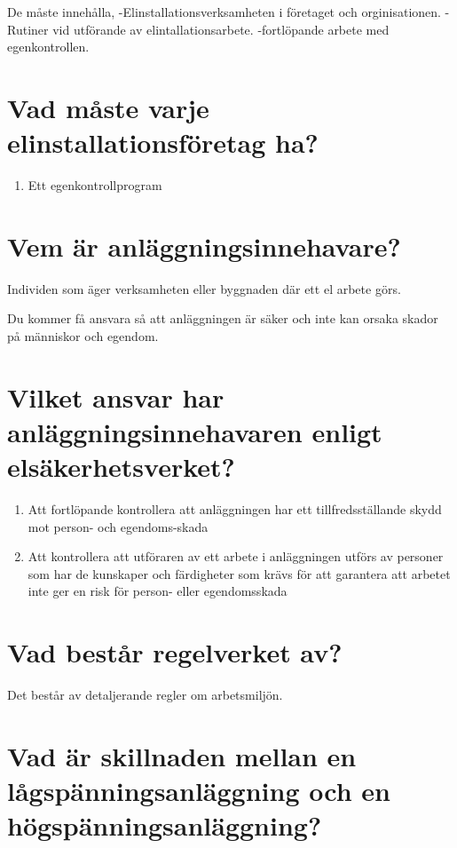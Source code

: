 \documentclass[a4paper,swedish]{article}
\begin{document}
De måste innehålla,
-Elinstallationsverksamheten i företaget och orginisationen.
- Rutiner vid utförande av elintallationsarbete.
-fortlöpande arbete med egenkontrollen.

\section{Vad måste varje elinstallationsföretag ha?}\label{sec:designated_person}

\begin{enumerate}
\item Ett egenkontrollprogram
\end{enumerate}

\section{Vem är anläggningsinnehavare?}
\label{sec:q_55}

Individen som äger verksamheten eller byggnaden där ett el arbete görs.

Du kommer få ansvara så att anläggningen är säker och inte kan orsaka skador på människor och egendom.

\section{Vilket ansvar har anläggningsinnehavaren enligt elsäkerhetsverket?}\label{sec:innehavarens_ansvar}

\begin{enumerate}
  \item Att fortlöpande kontrollera att anläggningen har ett tillfredsställande skydd mot person- och egendoms-skada
  \item Att kontrollera att utföraren av ett arbete i anläggningen utförs av personer som har de kunskaper och färdigheter
    som krävs för att garantera att arbetet inte ger en risk för person- eller egendomsskada
\end{enumerate}

\section{Vad består regelverket av?}
\label{sec:q_57}

Det består av  detaljerande regler om arbetsmiljön.

\section{Vad är skillnaden mellan en lågspänningsanläggning och en högspänningsanläggning?}
\end{document}
